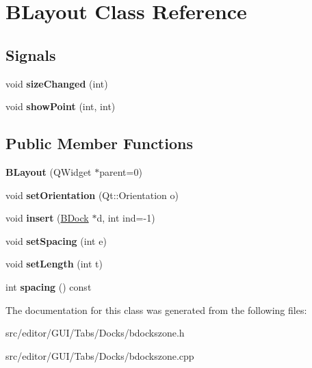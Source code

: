 \hypertarget{class_b_layout}{\section{\-B\-Layout \-Class \-Reference}
\label{class_b_layout}
}
\subsection*{\-Signals}
\begin{DoxyCompactItemize}
\item 
\hypertarget{class_b_layout_a9e27eb42d23daea4491e31dc65cde9bd}{void {\bfseries size\-Changed} (int)}\label{class_b_layout_a9e27eb42d23daea4491e31dc65cde9bd}

\item 
\hypertarget{class_b_layout_aa9926a76425a6fdc89131feec134444b}{void {\bfseries show\-Point} (int, int)}\label{class_b_layout_aa9926a76425a6fdc89131feec134444b}

\end{DoxyCompactItemize}
\subsection*{\-Public \-Member \-Functions}
\begin{DoxyCompactItemize}
\item 
\hypertarget{class_b_layout_aaa40bac25828f412e0c9f0295143222a}{{\bfseries \-B\-Layout} (\-Q\-Widget $\ast$parent=0)}\label{class_b_layout_aaa40bac25828f412e0c9f0295143222a}

\item 
\hypertarget{class_b_layout_a15af3c6623f5e820b011a237bd896fa5}{void {\bfseries set\-Orientation} (\-Qt\-::\-Orientation o)}\label{class_b_layout_a15af3c6623f5e820b011a237bd896fa5}

\item 
\hypertarget{class_b_layout_ad950c8e9f332986e6367081528de88d6}{void {\bfseries insert} (\hyperlink{class_b_dock}{\-B\-Dock} $\ast$d, int ind=-\/1)}\label{class_b_layout_ad950c8e9f332986e6367081528de88d6}

\item 
\hypertarget{class_b_layout_a2c129fc7bb433119b460eceac0540f85}{void {\bfseries set\-Spacing} (int e)}\label{class_b_layout_a2c129fc7bb433119b460eceac0540f85}

\item 
\hypertarget{class_b_layout_a59a4b4faeeac67c8260f4dd302ff3a66}{void {\bfseries set\-Length} (int t)}\label{class_b_layout_a59a4b4faeeac67c8260f4dd302ff3a66}

\item 
\hypertarget{class_b_layout_ac9a46249e19b37a07f049751df3ef391}{int {\bfseries spacing} () const }\label{class_b_layout_ac9a46249e19b37a07f049751df3ef391}

\end{DoxyCompactItemize}


\-The documentation for this class was generated from the following files\-:\begin{DoxyCompactItemize}
\item 
src/editor/\-G\-U\-I/\-Tabs/\-Docks/bdockszone.\-h\item 
src/editor/\-G\-U\-I/\-Tabs/\-Docks/bdockszone.\-cpp\end{DoxyCompactItemize}
